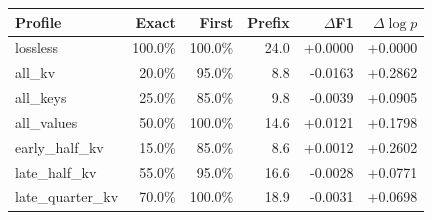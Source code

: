 \begin{tabular}{lrrrrr}
\toprule
Profile & Exact & First & Prefix & $\Delta$F1 & $\Delta\log p$ \\
\midrule
lossless & 100.0\% & 100.0\% & 24.0 & +0.0000 & +0.0000 \\
all\_kv & 20.0\% & 95.0\% & 8.8 & -0.0163 & +0.2862 \\
all\_keys & 25.0\% & 85.0\% & 9.8 & -0.0039 & +0.0905 \\
all\_values & 50.0\% & 100.0\% & 14.6 & +0.0121 & +0.1798 \\
early\_half\_kv & 15.0\% & 85.0\% & 8.6 & +0.0012 & +0.2602 \\
late\_half\_kv & 55.0\% & 95.0\% & 16.6 & -0.0028 & +0.0771 \\
late\_quarter\_kv & 70.0\% & 100.0\% & 18.9 & -0.0031 & +0.0698 \\
\bottomrule
\end{tabular}
